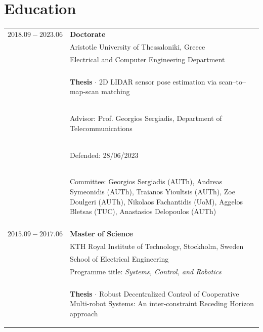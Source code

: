 \documentclass[a4paper,10pt,twoside]{article}
\begin{document}
\section{Education}

\begin{tabular}{rp{11cm}}
$2018.09 - 2023.06$  & \textbf{Doctorate} \\
                     & Aristotle University of Thessaloniki, Greece \\
                     & Electrical and Computer Engineering Department \\
                     & \\
                     & \begin{small}\textbf{Thesis} $\cdot$ 2D LIDAR sensor pose estimation via scan--to--map-scan matching \end{small} \\
                     & \begin{small}Advisor: Prof. Georgios Sergiadis, Department of Telecommunications\end{small} \\
                     & \begin{small}Defended: 28/06/2023\end{small}\\
                     & \begin{small}Committee: Georgios Sergiadis (AUTh),
                     Andreas Symeonidis (AUTh), Traianos Yioultsis (AUTh),
                     Zoe Doulgeri (AUTh), Nikolaos Fachantidis (UoM), Aggelos Bletsas (TUC), Anastasios Delopoulos (AUTh) \end{small}\\
&\\
$2015.09 - 2017.06$  & \textbf{Master of Science} \\
                     & KTH Royal Institute of Technology, Stockholm, Sweden\\
                     & School of Electrical Engineering\\
                     & Programme title: \textit{Systems, Control, and Robotics} \\
                     & \\
                     & \begin{small}\textbf{Thesis} $\cdot$ Robust Decentralized Control of Cooperative Multi-robot Systems:
                       An inter-constraint Receding Horizon approach\end{small} \\

\end{tabular}
\end{document}
